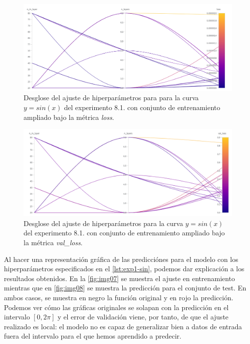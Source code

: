\begin{figure}[htbp]
    \centering
    \includegraphics[width=1\textwidth]{img/img73.png}
    \caption{Desglose del ajuste de hiperparámetros para para la curva $y=sin(x)$ del experimento 8.1. con conjunto de entrenamiento ampliado bajo la métrica \textit{loss}.}
    \label{fig:img73}
\end{figure}

\begin{figure}[htbp]
    \centering
    \includegraphics[width=1\textwidth]{img/img74.png}
    \caption{Desglose del ajuste de hiperparámetros para la curva $y=sin(x)$ del experimento 8.1. con conjunto de entrenamiento ampliado bajo la métrica \textit{val\_loss}.} 
    \label{fig:img74}
\end{figure}

Al hacer una representación gráfica de las predicciónes para el modelo con los hiperparámetros especificados en el \autoref{lst:exp1-sin}, podemos dar explicación a los resultados obtenidos. En la \autoref{fig:img07} se muestra el ajuste en entrenamiento mientras que en \autoref{fig:img08} se muestra la predicción para el conjunto de test. En ambos casos, se muestra en negro la función original y en rojo la predicción. Podemos ver cómo las gráficas originales se solapan con la predicción en el intervalo $[0,2\pi]$ y el error de validación viene, por tanto, de que el ajuste realizado es local: el modelo no es capaz de generalizar bien a datos de entrada fuera del intervalo para el que hemos aprendido a predecir. 



